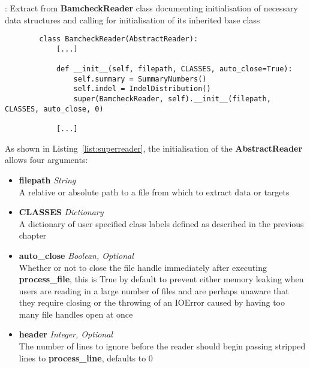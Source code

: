 \begin{listing}[H]
    \caption[superreader]{: Extract from \textbf{BamcheckReader} class
        documenting initialisation of necessary data structures and calling
        for initialisation of its inherited base class}
    \label{list:superreader}
    \begin{verbatim}
        class BamcheckReader(AbstractReader):
            [...]

            def __init__(self, filepath, CLASSES, auto_close=True):
                self.summary = SummaryNumbers()
                self.indel = IndelDistribution()
                super(BamcheckReader, self).__init__(filepath, CLASSES, auto_close, 0)

            [...]
    \end{verbatim}
\end{listing}

As shown in Listing~\ref{list:superreader}, the initialisation of the
\textbf{AbstractReader} allows four arguments:

\begin{itemize}
    \item \textbf{filepath} \textit{String}\hfill\\
        A relative or absolute path to a file from which to extract data or
        targets
    \item \textbf{CLASSES} \textit{Dictionary}\hfill\\
        A dictionary of user specified class labels defined as described in
        the previous chapter
    \item \textbf{auto\_close} \textit{Boolean, Optional}\hfill\\
        Whether or not to close the file handle immediately after executing
        \textbf{process\_file}, this is True by default to prevent either memory
        leaking when users are reading in a large number of files and are
        perhaps unaware that they require closing or the throwing of an IOError
        caused by having too many file handles open at once
    \item \textbf{header} \textit{Integer, Optional}\hfill\\
        The number of lines to ignore before the reader should begin
        passing stripped lines to \textbf{process\_line}, defaults to 0
\end{itemize}


